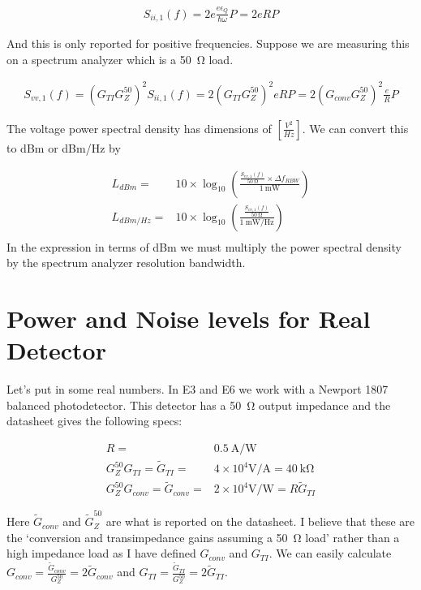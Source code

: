\documentclass[12pt]{article}
\newcommand{\ep}{\epsilon}
\begin{document}
\begin{align}
S_{ii,1}(f) = 2e \frac{e\ep_Q}{\hbar \omega} P = 2e RP
\end{align}

And this is only reported for positive frequencies.
Suppose we are measuring this on a spectrum analyzer which is a \SI{50}{\ohm} load.

\begin{align}
\label{eq:shotnoise}
S_{vv,1}(f) = \left(G_{TI}G_Z^{50}\right)^2 S_{ii,1}(f) = 2\left(G_{TI}G_Z^{50}\right)^2 e RP = 2 \left(G_{conv}G_Z^{50}\right)^2 \frac{e}{R} P
\end{align}

The voltage power spectral density has dimensions of $\left[\frac{V^2}{Hz}\right]$.
We can convert this to dBm or dBm/Hz by

\begin{align}
L_{dBm} =& 10 \times \log_{10}\left(\frac{\frac{S_{vv,1}(f)}{\SI{50}{\ohm}} \times \Delta f_{RBW}}{\SI{1}{\milli \watt}}\right)\\
L_{dBm/Hz} =& 10 \times \log_{10}\left(\frac{\frac{S_{vv,1}(f)}{\SI{50}{\ohm}}}{\SI{1}{\milli \watt / \Hz}}\right)\\
\end{align}
In the expression in terms of dBm we must multiply the power spectral density by the spectrum analyzer resolution bandwidth.

\section{Power and Noise levels for Real Detector}
Let's put in some real numbers.
In E3 and E6 we work with a Newport 1807 balanced photodetector.
This detector has a \SI{50}{\ohm} output impedance and the datasheet gives the following specs:

\begin{align}
R =& \SI{0.5}{\A / \watt}\\
G_Z^{50}G_{TI} = \tilde{G}_{TI} =& 4\times 10^4 \si{\V / \A} = \SI{40}{\kilo \ohm}\\
G_Z^{50}G_{conv} = \tilde{G}_{conv}=& 2\times 10^4 \si{\V / \watt} = R \tilde{G}_{TI}
\end{align}

Here $\tilde{G}_{conv}$ and $\tilde{G}_Z^{50}$ are what is reported on the datasheet.
I believe that these are the `conversion and transimpedance gains assuming a \SI{50}{\ohm} load' rather than a high impedance load as I have defined $G_{conv}$ and $G_{TI}$.
We can easily calculate $G_{conv} = \frac{\tilde{G}_{conv}}{G_Z^{50}} = 2\tilde{G}_{conv}$ and $G_{TI} = \frac{\tilde{G}_{TI}}{G_Z^{50}} = 2\tilde{G}_{TI}$.
\end{document}
